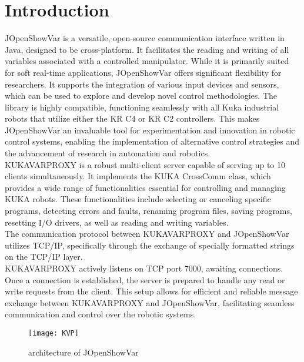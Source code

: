 \section{Introduction}

JOpenShowVar is a versatile, open-source communication 
interface written in Java, designed to be cross-platform. 
It facilitates the reading and writing of all variables 
associated with a controlled manipulator. 
While it is primarily suited for soft real-time applications, 
JOpenShowVar offers significant flexibility for researchers. 
It supports the integration of various input devices and sensors, 
which can be used to explore and develop novel control 
methodologies. The library is highly compatible, 
functioning seamlessly with all Kuka industrial robots that 
utilize either the KR C4 or KR C2 controllers. 
This makes JOpenShowVar an invaluable tool for experimentation 
and innovation in robotic control systems, enabling the 
implementation of alternative control strategies and the 
advancement of research in automation and robotics.\cite{sanfilippo2015controlling}
\\ KUKAVARPROXY is a robust multi-client server capable of 
serving up to 10 clients simultaneously. 
It implements the KUKA CrossComm class, 
which provides a wide range of functionalities essential for 
controlling and managing KUKA robots. 
These functionalities include selecting or canceling 
specific programs, detecting errors and faults, 
renaming program files, saving programs, resetting I/O drivers, 
as well as reading and writing variables.\cite{sanfilippo2015controlling}
\\ The communication protocol between KUKAVARPROXY and 
JOpenShowVar utilizes TCP/IP, specifically through the 
exchange of specially formatted strings on the TCP/IP layer. 
\\ KUKAVARPROXY actively listens on TCP port 7000, awaiting 
connections. Once a connection is established, the server is 
prepared to handle any read or write requests from the client. 
This setup allows for efficient and reliable message exchange 
between KUKAVARPROXY and JOpenShowVar, facilitating seamless 
communication and control over the robotic systems.\cite{sanfilippo2015controlling}

\begin{figure}[h]
    \centering
    \texttt{[image: KVP]}
    \caption{architecture of JOpenShowVar}
    \label{fig:mesh1}
\end{figure}